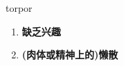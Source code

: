 
\begin{frame}
{\huge torpor}
\begin{center}
\begin{enumerate}\Large
  \item \textbf{缺乏兴趣}
  \item \textbf{(肉体或精神上的)懒散}
\end{enumerate}
\end{center}
\end{frame}
